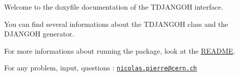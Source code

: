 Welcome to the doxyfile documentation of the T\+D\+J\+A\+N\+G\+OH interface.

You can find several informations about the T\+D\+J\+A\+N\+G\+OH class and the D\+J\+A\+N\+G\+OH generator.

For more informations about running the package, look at the \hyperlink{md__r_e_a_d_m_e}{R\+E\+A\+D\+ME}.

For any problem, input, questions \+: \href{mailto:nicolas.pierre@cern.ch}{\tt nicolas.\+pierre@cern.\+ch} 
